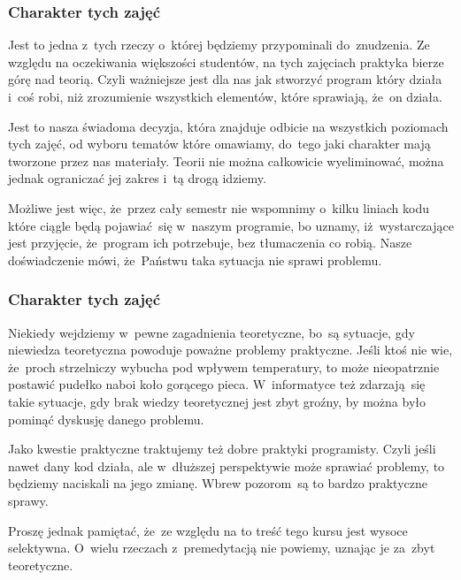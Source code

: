 \documentclass[10pt,t]{beamer}
\begin{document}
\begin{frame}
  \frametitle{Charakter tych zajęć}


  Jest to jedna z~tych rzeczy o~której będziemy przypominali do~znudzenia.
  Ze względu na oczekiwania większości studentów, na tych zajęciach
  \alert{praktyka bierze górę nad teorią}. Czyli ważniejsze jest dla nas jak
  stworzyć program który działa i~coś robi, niż zrozumienie wszystkich
  elementów, które sprawiają, że~on działa.

  Jest to nasza świadoma decyzja, która znajduje odbicie na wszystkich
  poziomach tych zajęć, od wyboru tematów które omawiamy, do~tego jaki
  charakter mają tworzone przez nas materiały. Teorii nie można całkowicie
  wyeliminować, można jednak ograniczać jej zakres i~tą drogą idziemy.

  Możliwe jest więc, że~przez cały semestr nie wspomnimy o~kilku liniach
  kodu które ciągle będą pojawiać~się w~naszym programie, bo uznamy,
  iż~wystarczające jest przyjęcie, że~program ich potrzebuje, bez
  tłumaczenia co robią. Nasze doświadczenie mówi, że~Państwu taka sytuacja
  nie sprawi problemu.

\end{frame}





\begin{frame}
  \frametitle{Charakter tych zajęć}


  Niekiedy wejdziemy w~pewne zagadnienia teoretyczne, bo~są sytuacje, gdy
  niewiedza teoretyczna powoduje poważne problemy praktyczne. Jeśli ktoś
  nie wie, że~proch strzelniczy wybucha pod wpływem temperatury, to może
  nieopatrznie postawić pudełko naboi koło gorącego pieca. W~informatyce
  też zdarzają~się takie sytuacje, gdy brak wiedzy teoretycznej jest zbyt
  groźny, by można było pominąć dyskusję danego problemu.

  Jako kwestie praktyczne traktujemy też dobre praktyki programisty.
  Czyli jeśli nawet dany kod działa, ale w~dłuższej perspektywie może
  sprawiać problemy, to będziemy naciskali na jego zmianę. Wbrew
  pozorom~są to bardzo praktyczne sprawy.

  Proszę jednak pamiętać, że~ze względu na to treść tego kursu jest wysoce
  selektywna. O~wielu rzeczach z~premedytacją nie powiemy, uznając je
  za~zbyt teoretyczne.

\end{frame}
\end{document}
